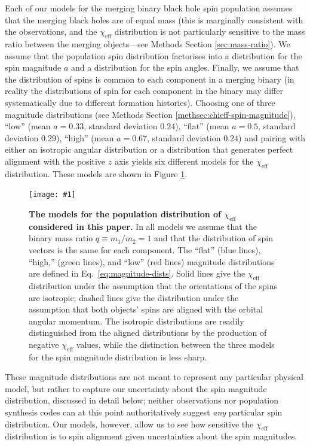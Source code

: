 \documentclass{nature}
\newcommand{\chieff}{\chi_\mathrm{eff}}
\newcommand{\plotone}[1]{\texttt{[image: \#1]}}
\begin{document}
Each of our models for the merging binary black hole spin population
assumes that the merging black holes are of equal mass (this is
marginally consistent with the
observations\cite{O1-BBH,PhysRevLett.118.221101}, and the $\chieff$
distribution is not particularly sensitive to the mass ratio between
the merging objects---see Methods Section \ref{sec:mass-ratio}).  We
assume that the population spin distribution factorises into a
distribution for the spin magnitude $a$ and a distribution for the
spin angles.  Finally, we assume that the distribution of spins is
common to each component in a merging binary (in reality the
distributions of spin for each component in the binary may differ
systematically due to different formation histories).  Choosing one of
three magnitude distributions (see Methods Section
\ref{methsec:chieff-spin-magnitude}), ``low'' (mean $a = 0.33$,
standard deviation $0.24$), ``flat'' (mean $a = 0.5$, standard
deviation $0.29$), ``high'' (mean $a = 0.67$, standard deviation
$0.24$) and pairing with either an isotropic angular distribution or a
distribution that generates perfect alignment with the positive $z$
axis yields six different models for the $\chieff$ distribution.
These models are shown in Figure \ref{fig:chieff-distribution-models}.

\begin{figure}
  \plotone{plots/chi-eff-distributions}
  \caption{\label{fig:chieff-distribution-models} \textbf{The models for the
    population distribution of $\chieff$ considered in this paper.}  In
    all models we assume that the binary mass ratio
    $q \equiv m_1/m_2 = 1$ and that the distribution of spin vectors
    is the same for each component.  The ``flat'' (blue lines),
    ``high,'' (green lines), and ``low'' (red lines) magnitude
    distributions are defined in Eq.\ \eqref{eq:magnitude-dists}.
    Solid lines give the $\chieff$ distribution under the assumption
    that the orientations of the spins are isotropic; dashed lines
    give the distribution under the assumption that both objects'
    spins are aligned with the orbital angular momentum.  The
    isotropic distributions are readily distinguished from the aligned
    distributions by the production of negative $\chieff$ values,
    while the distinction between the three models for the spin
    magnitude distribution is less sharp.}
\end{figure}

These magnitude distributions are not meant to represent any
particular physical model, but rather to capture our uncertainty about
the spin magnitude distribution, discussed in detail below; neither
observations nor population synthesis codes can at this point
authoritatively suggest \emph{any} particular spin
distribution\cite{2015PhR...548....1M}.  Our models, however, allow us
to see how sensitive the $\chieff$ distribution is to spin alignment
given uncertainties about the spin magnitudes.
\end{document}
